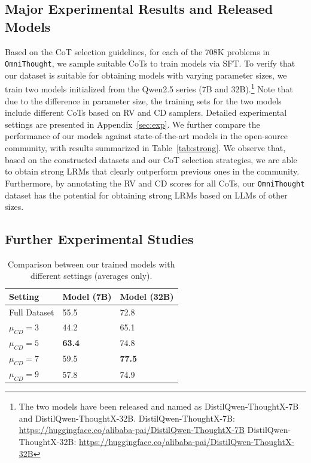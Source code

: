 \documentclass{article}
\begin{document}
\subsection{Major Experimental Results and Released Models}
Based on the CoT selection guidelines, for each of the 708K problems in \texttt{OmniThought}, we sample suitable CoTs to train models via SFT. To verify that our dataset is suitable for obtaining models with varying parameter sizes, we train two models initialized from the Qwen2.5 series (7B and 32B).\footnote{The two models have been released and named as DistilQwen-ThoughtX-7B and DistilQwen-ThoughtX-32B. DistilQwen-ThoughtX-7B: \url{https://huggingface.co/alibaba-pai/DistilQwen-ThoughtX-7B}
DistilQwen-ThoughtX-32B: \url{https://huggingface.co/alibaba-pai/DistilQwen-ThoughtX-32B}} Note that due to the difference in parameter size, the training sets for the two models include different CoTs based on RV and CD samplers. Detailed experimental settings are presented in Appendix~\ref{sec:exp}. We further compare the performance of our models against state-of-the-art models in the open-source community, with results summarized in Table~\ref{tab:strong}. We observe that, based on the constructed datasets and our CoT selection strategies, we are able to obtain strong LRMs that clearly outperform previous ones in the community. Furthermore, by annotating the RV and CD scores for all CoTs, our \texttt{OmniThought} dataset has the potential for obtaining strong LRMs based on LLMs of other sizes. 



\subsection{Further Experimental Studies}







\begin{table}
\centering
\caption{Comparison between our trained models with different settings (averages only).}
\begin{small}
\begin{tabular}{l|ll}
\hline
\bf Setting & \bf Model (7B) & \bf Model (32B)\\
\hline
Full Dataset & 55.5 & 72.8\\
\hline
$\mu_{CD}=3$ & 44.2 & 65.1\\
$\mu_{CD}=5$ & \bf 63.4 & 74.8\\
$\mu_{CD}=7$ & 59.5 & \bf 77.5\\
$\mu_{CD}=9$ & 57.8 & 74.9\\
\hline
\end{tabular}
\end{small}
\label{tab:summary}
\end{table}
\end{document}
